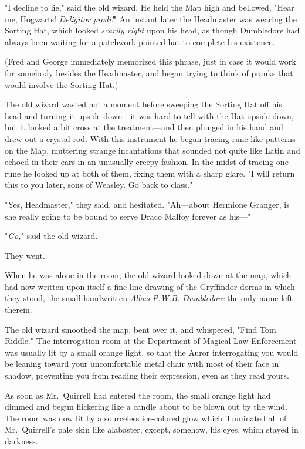 "I decline to lie," said the old wizard. He held the Map high and bellowed, 
"Hear me, Hogwarts! \emph{Deligitor prodi!}" An instant later the Headmaster 
was wearing the Sorting Hat, which looked \emph{scarily right} upon his head, 
as though Dumbledore had always been waiting for a patchwork pointed hat to 
complete his existence.

(Fred and George immediately memorized this phrase, just in case it would work 
for somebody besides the Headmaster, and began trying to think of pranks that 
would involve the Sorting Hat.)

The old wizard wasted not a moment before sweeping the Sorting Hat off his head 
and turning it upside-down---it was hard to tell with the Hat upside-down, but 
it looked a bit cross at the treatment---and then plunged in his hand and drew 
out a crystal rod. With this instrument he began tracing rune-like patterns on 
the Map, muttering strange incantations that sounded not quite like Latin and 
echoed in their ears in an unusually creepy fashion. In the midst of tracing 
one rune he looked up at both of them, fixing them with a sharp glare. "I will 
return this to you later, sons of Weasley. Go back to class."

"Yes, Headmaster," they said, and hesitated. "Ah---about Hermione Granger, is 
she really going to be bound to serve Draco Malfoy forever as his---"

"\emph{Go,}" said the old wizard.

They went.

When he was alone in the room, the old wizard looked down at the map, which had 
now written upon itself a fine line drawing of the Gryffindor dorms in which 
they stood, the small handwritten \emph{Albus P.W.B. Dumbledore} the only name 
left therein.

The old wizard smoothed the map, bent over it, and whispered, "Find Tom Riddle."
\sbreak
The interrogation room at the Department of Magical Law Enforcement was usually 
lit by a small orange light, so that the Auror interrogating you would be 
leaning toward your uncomfortable metal chair with most of their face in 
shadow, preventing you from reading their expression, even as they read yours.

As soon as Mr.~Quirrell had entered the room, the small orange light had dimmed 
and begun flickering like a candle about to be blown out by the wind. The room 
was now lit by a sourceless ice-colored glow which illuminated all of 
Mr.~Quirrell's pale skin like alabaster, except, somehow, his eyes, which 
stayed in darkness.

